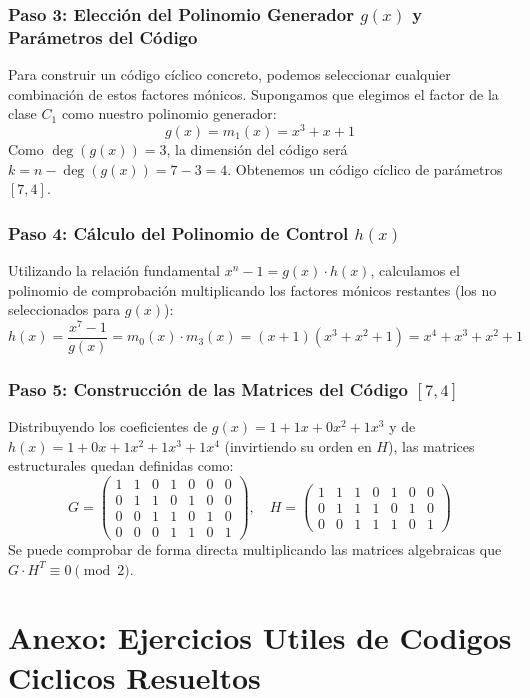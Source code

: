 \documentclass{article}
\begin{document}
\subsubsection{Paso 3: Elección del Polinomio Generador $g(x)$ y Parámetros del Código}
Para construir un código cíclico concreto, podemos seleccionar cualquier combinación de estos factores mónicos. Supongamos que elegimos el factor de la clase $C_1$ como nuestro polinomio generador:
\[
g(x) = m_1(x) = x^3 + x + 1
\]
Como $\operatorname{deg}(g(x)) = 3$, la dimensión del código será $k = n - \operatorname{deg}(g(x)) = 7 - 3 = 4$. Obtenemos un código cíclico de parámetros $[7, 4]$.

\subsubsection{Paso 4: Cálculo del Polinomio de Control $h(x)$}
Utilizando la relación fundamental $x^n - 1 = g(x) \cdot h(x)$, calculamos el polinomio de comprobación multiplicando los factores mónicos restantes (los no seleccionados para $g(x)$):
\[
h(x) = \frac{x^7 - 1}{g(x)} = m_0(x) \cdot m_3(x) = (x + 1)(x^3 + x^2 + 1) = x^4 + x^3 + x^2 + 1
\]

\subsubsection{Paso 5: Construcción de las Matrices del Código $[7, 4]$}
Distribuyendo los coeficientes de $g(x) = 1 + 1x + 0x^2 + 1x^3$ y de $h(x) = 1 + 0x + 1x^2 + 1x^3 + 1x^4$ (invirtiendo su orden en $H$), las matrices estructurales quedan definidas como:
\[
G = \begin{pmatrix}
1 & 1 & 0 & 1 & 0 & 0 & 0 \\
0 & 1 & 1 & 0 & 1 & 0 & 0 \\
0 & 0 & 1 & 1 & 0 & 1 & 0 \\
0 & 0 & 0 & 1 & 1 & 0 & 1
\end{pmatrix}, \quad
H = \begin{pmatrix}
1 & 1 & 1 & 0 & 1 & 0 & 0 \\
0 & 1 & 1 & 1 & 0 & 1 & 0 \\
0 & 0 & 1 & 1 & 1 & 0 & 1
\end{pmatrix}
\]
Se puede comprobar de forma directa multiplicando las matrices algebraicas que $G \cdot H^T \equiv 0 \pmod 2$.


\newpage
\section{Anexo: Ejercicios Utiles de Codigos Ciclicos Resueltos}
\end{document}
